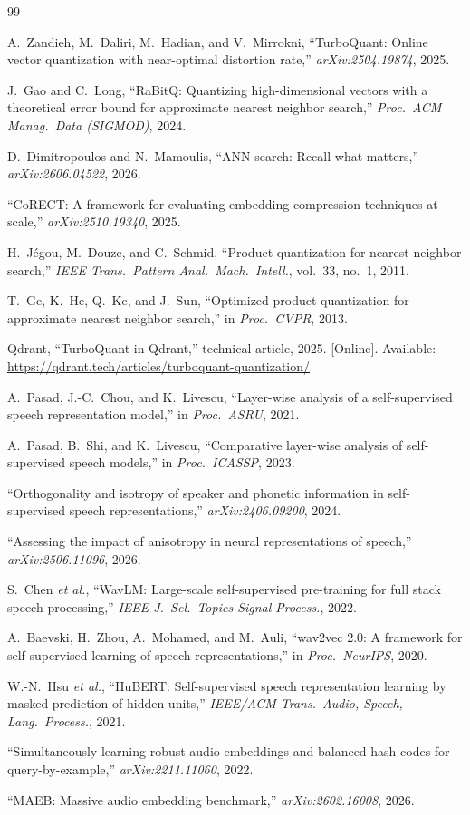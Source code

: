 \documentclass[conference]{IEEEtran}
\begin{document}
\begin{thebibliography}{99}

A.~Zandieh, M.~Daliri, M.~Hadian, and V.~Mirrokni, ``TurboQuant: Online vector quantization with
near-optimal distortion rate,'' \emph{arXiv:2504.19874}, 2025.

J.~Gao and C.~Long, ``RaBitQ: Quantizing high-dimensional vectors with a theoretical error bound
for approximate nearest neighbor search,'' \emph{Proc.\ ACM Manag.\ Data (SIGMOD)}, 2024.

D.~Dimitropoulos and N.~Mamoulis, ``ANN search: Recall what matters,'' \emph{arXiv:2606.04522},
2026.

``CoRECT: A framework for evaluating embedding compression techniques at scale,''
\emph{arXiv:2510.19340}, 2025.

H.~J\'egou, M.~Douze, and C.~Schmid, ``Product quantization for nearest neighbor search,''
\emph{IEEE Trans.\ Pattern Anal.\ Mach.\ Intell.}, vol.~33, no.~1, 2011.

T.~Ge, K.~He, Q.~Ke, and J.~Sun, ``Optimized product quantization for approximate nearest neighbor
search,'' in \emph{Proc.\ CVPR}, 2013.

Qdrant, ``TurboQuant in Qdrant,'' technical article, 2025. [Online]. Available:
\url{https://qdrant.tech/articles/turboquant-quantization/}

A.~Pasad, J.-C.~Chou, and K.~Livescu, ``Layer-wise analysis of a self-supervised speech
representation model,'' in \emph{Proc.\ ASRU}, 2021.

A.~Pasad, B.~Shi, and K.~Livescu, ``Comparative layer-wise analysis of self-supervised speech
models,'' in \emph{Proc.\ ICASSP}, 2023.

``Orthogonality and isotropy of speaker and phonetic information in self-supervised speech
representations,'' \emph{arXiv:2406.09200}, 2024.

``Assessing the impact of anisotropy in neural representations of speech,''
\emph{arXiv:2506.11096}, 2026.

S.~Chen \emph{et al.}, ``WavLM: Large-scale self-supervised pre-training for full stack speech
processing,'' \emph{IEEE J.\ Sel.\ Topics Signal Process.}, 2022.

A.~Baevski, H.~Zhou, A.~Mohamed, and M.~Auli, ``wav2vec 2.0: A framework for self-supervised
learning of speech representations,'' in \emph{Proc.\ NeurIPS}, 2020.

W.-N.~Hsu \emph{et al.}, ``HuBERT: Self-supervised speech representation learning by masked
prediction of hidden units,'' \emph{IEEE/ACM Trans.\ Audio, Speech, Lang.\ Process.}, 2021.

``Simultaneously learning robust audio embeddings and balanced hash codes for query-by-example,''
\emph{arXiv:2211.11060}, 2022.

``MAEB: Massive audio embedding benchmark,'' \emph{arXiv:2602.16008}, 2026.

\end{thebibliography}
\end{document}
